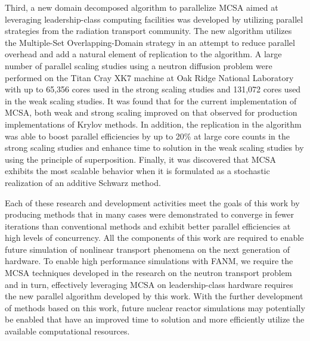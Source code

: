 Third, a new domain decomposed algorithm to parallelize MCSA aimed at
leveraging leadership-class computing facilities was developed by
utilizing parallel strategies from the radiation transport
community. The new algorithm utilizes the Multiple-Set
Overlapping-Domain strategy in an attempt to reduce parallel overhead
and add a natural element of replication to the algorithm. A large
number of parallel scaling studies using a neutron diffusion problem
were performed on the Titan Cray XK7 machine at Oak Ridge National
Laboratory with up to 65,356 cores used in the strong scaling studies
and 131,072 cores used in the weak scaling studies. It was found that
for the current implementation of MCSA, both weak and strong scaling
improved on that observed for production implementations of Krylov
methods. In addition, the replication in the algorithm was able to
boost parallel efficiencies by up to 20\% at large core counts in the
strong scaling studies and enhance time to solution in the weak
scaling studies by using the principle of superposition. Finally, it
was discovered that MCSA exhibits the most scalable behavior when it
is formulated as a stochastic realization of an additive Schwarz
method.

Each of these research and development activities meet the goals of
this work by producing methods that in many cases were demonstrated to
converge in fewer iterations than conventional methods and exhibit
better parallel efficiencies at high levels of concurrency. All the
components of this work are required to enable future simulation of
nonlinear transport phenomena on the next generation of hardware. To
enable high performance simulations with FANM, we require the MCSA
techniques developed in the research on the neutron transport problem
and in turn, effectively leveraging MCSA on leadership-class hardware
requires the new parallel algorithm developed by this work. With the
further development of methods based on this work, future nuclear
reactor simulations may potentially be enabled that have an improved
time to solution and more efficiently utilize the available
computational resources.

